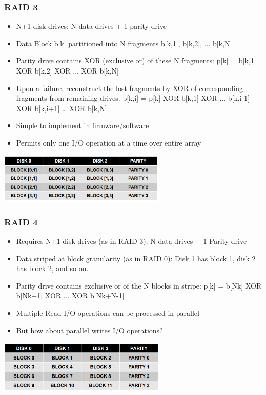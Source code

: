\documentclass[12pt]{article}
\begin{document}
\subsubsection{RAID 3}
\begin{itemize}
    \item N+1 disk drives: N data drives + 1 parity drive
    \item Data Block b[k] partitioned into N fragments b[k,1], b[k,2], ... b[k,N] 
    \item Parity drive contains XOR (exclusive or) of these N fragments: p[k] = b[k,1] XOR b[k,2] XOR ... XOR b[k,N] 
    \item Upon a failure, reconstruct the lost fragments by XOR of corresponding fragments from remaining drives. b[k,i] = p[k] XOR b[k,1] XOR ... b[k,i-1] XOR b[k,i+1] … XOR b[k,N] 
    \item Simple to implement in firmware/software 
    \item Permits only one I/O operation at a time over entire array
\end{itemize}
\includegraphics[width=0.6\textwidth]{Raid3.png}
\subsubsection{RAID 4}
\begin{itemize}
    \item Requires N+1 disk drives (as in RAID 3): N data drives + 1 Parity drive 
    \item Data striped at block granularity (as in RAID 0): Disk 1 has block 1, disk 2 has block 2, and so on. 
    \item Parity drive contains exclusive or of the N blocks in stripe: p[k] = b[Nk] XOR b[Nk+1] XOR ... XOR b[Nk+N-1] 
    \item Multiple Read I/O operations can be processed in parallel 
    \item But how about parallel writes I/O operations?
\end{itemize}
\includegraphics[width=0.6\textwidth]{Raid4.png}
\end{document}
